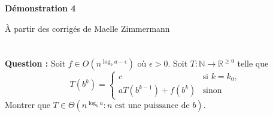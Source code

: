 \documentclass[11pt]{article} %
\newenvironment{question}[1][\unskip]{%
	\par
	\noindent
	\textbf{Question #1:}
	\noindent}
{\medskip}
\begin{document}
		
	
	\noindent \hrulefill
	\centerline{\bfseries Démonstration 4}
	\centerline{À partir des corrigés de Maelle Zimmermann}	
	\noindent \hrulefill
	
	\vspace{1cm}
	
	\section{}
	\begin{question}
		Soit $f \in O(n^{\log_ba-\epsilon})$ où $\epsilon > 0$. Soit $T: \mathbb{N} \rightarrow \mathbb{R}^{\geq 0}$ telle que
		\begin{equation*}
			T(b^k)=\left\{
			\begin{array}{ll}
				c & \text{si } k= k_0,\\
				aT(b^{k-1})+f(b^k) & \text{sinon }
			\end{array} \right.
		\end{equation*}
		Montrer que $T \in \Theta(n^{\log_b a} : n\text{ est une puissance de }b)$.
	\end{question}
\end{document}
